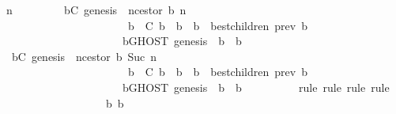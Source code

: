 \begin{isabellebody}
\ n\isanewline
\ \ \ \ \ \ \isamarkupfalse%
\ {\isachardoublequoteopen}{\isasymforall}{\isasymsigma}{\isasymin}{\isasymSigma}{\isachardot}\ {\isasymforall}b{\isasymin}C{\isachardot}\ genesis\ {\isacharequal}\ n{\isacharunderscore}cestor\ {\isacharparenleft}b{\isacharcomma}\ n{\isacharparenright}\ {\isasymand}\isanewline
\ \ \ \ \ \ \ \ \ \ \ \ \ \ \ \ \ \ \ \ \ \ {\isacharparenleft}{\isasymforall}\ b{\isacharprime}\ {\isasymin}\ C{\isachardot}\ b{\isacharprime}\ {\isasymdownharpoonright}\ b\ {\isasymlongrightarrow}\ b{\isacharprime}\ {\isasymin}\ best{\isacharunderscore}children\ {\isacharparenleft}prev\ b{\isacharprime}{\isacharcomma}\ {\isasymsigma}{\isacharparenright}{\isacharparenright}\ {\isasymlongrightarrow}\isanewline
\ \ \ \ \ \ \ \ \ \ \ \ \ \ \ \ \ \ \ \ \ \ {\isacharparenleft}{\isasymforall}b{\isacharprime}{\isacharprime}{\isasymin}GHOST\ {\isacharparenleft}{\isacharbraceleft}genesis{\isacharbraceright}{\isacharcomma}\ {\isasymsigma}{\isacharparenright}{\isachardot}\ b\ {\isasymdownharpoonright}\ b{\isacharprime}{\isacharprime}{\isacharparenright}{\isachardoublequoteclose}\ \isanewline
\ \ \ \ \ \ \isamarkupfalse%
\ {\isachardoublequoteopen}{\isasymforall}{\isasymsigma}{\isasymin}{\isasymSigma}{\isachardot}\ {\isasymforall}b{\isasymin}C{\isachardot}\ genesis\ {\isacharequal}\ n{\isacharunderscore}cestor\ {\isacharparenleft}b{\isacharcomma}\ Suc\ n{\isacharparenright}\ {\isasymand}\isanewline
\ \ \ \ \ \ \ \ \ \ \ \ \ \ \ \ \ \ \ \ \ \ {\isacharparenleft}{\isasymforall}\ b{\isacharprime}\ {\isasymin}\ C{\isachardot}\ b{\isacharprime}\ {\isasymdownharpoonright}\ b\ {\isasymlongrightarrow}\ b{\isacharprime}\ {\isasymin}\ best{\isacharunderscore}children\ {\isacharparenleft}prev\ b{\isacharprime}{\isacharcomma}\ {\isasymsigma}{\isacharparenright}{\isacharparenright}\ {\isasymlongrightarrow}\isanewline
\ \ \ \ \ \ \ \ \ \ \ \ \ \ \ \ \ \ \ \ \ \ {\isacharparenleft}{\isasymforall}b{\isacharprime}{\isacharprime}{\isasymin}GHOST\ {\isacharparenleft}{\isacharbraceleft}genesis{\isacharbraceright}{\isacharcomma}\ {\isasymsigma}{\isacharparenright}{\isachardot}\ b\ {\isasymdownharpoonright}\ b{\isacharprime}{\isacharprime}{\isacharparenright}{\isachardoublequoteclose}\isanewline
\ \ \ \ \ \ \ \ \isamarkupfalse%
\ {\isacharparenleft}rule{\isacharcomma}\ rule{\isacharcomma}\ rule{\isacharcomma}\ rule{\isacharparenright}\isanewline
\ \ \ \ \ \ \isamarkupfalse%
\ {\isacharminus}\isanewline
\ \ \ \ \ \ \ \ \isamarkupfalse%
\ {\isasymsigma}\ b\ b{\isacharprime}{\isacharprime}\isanewline

\end{isabellebody}
